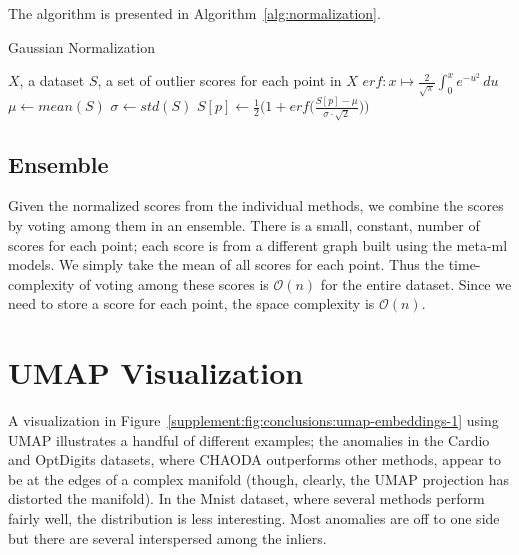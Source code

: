 The algorithm is presented in Algorithm~\ref{alg:normalization}.

\begin{algorithm}[h]
    \caption{Gaussian Normalization}
    \label{alg:normalization}
\begin{algorithmic}[1]
    \REQUIRE $X$, a dataset
    \REQUIRE $S$, a set of outlier scores for each point in $X$
    \STATE $erf: x \mapsto \frac{2}{\sqrt{\pi}} \int_{0}^{x} e^{-u^2} \,du $
    \STATE $\mu \gets mean(S)$
    \STATE $\sigma \gets std(S)$
        \STATE $S[p] \gets \frac{1}{2} \Big( 1 + erf \big(\frac{S[p] - \mu}{\sigma \cdot \sqrt{2}}\big) \Big) $
    \ENDFOR
\end{algorithmic}
\end{algorithm}

\subsection{Ensemble}

Given the normalized scores from the individual methods, we combine the scores by voting among them in an ensemble.
There is a small, constant, number of scores for each point; each score is from a different graph built using the meta-ml models.
We simply take the mean of all scores for each point.
Thus the time-complexity of voting among these scores is $\mathcal{O}(n)$ for the entire dataset.
Since we need to store a score for each point, the space complexity is $\mathcal{O}(n)$.


\section{UMAP Visualization}
\label{supplement:sec:umap-visualization}

A visualization in Figure~\ref{supplement:fig:conclusions:umap-embeddings-1} using UMAP illustrates a handful of different examples;
the anomalies in the Cardio and OptDigits datasets, where CHAODA outperforms other methods, appear to be at the edges of a complex manifold (though, clearly, the UMAP projection has distorted the manifold).
In the Mnist dataset, where several methods perform fairly well, the distribution is less interesting.
Most anomalies are off to one side but there are several interspersed among the inliers.

